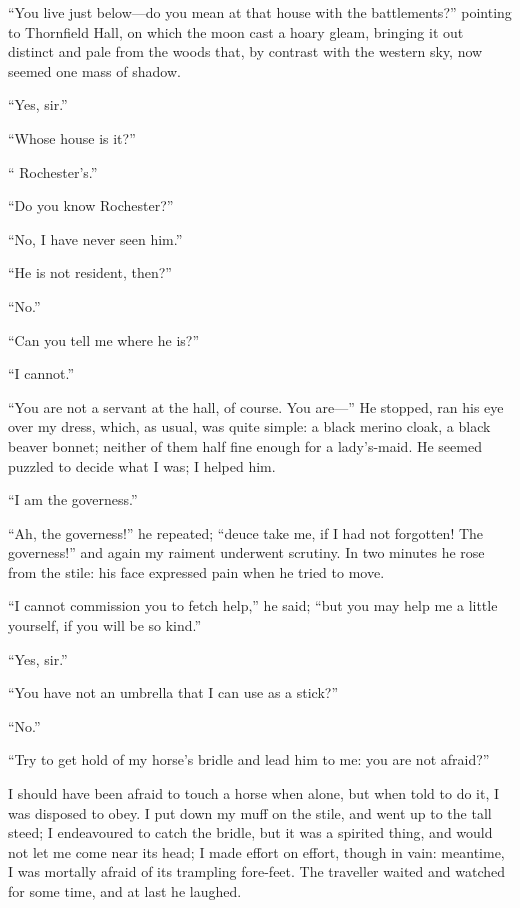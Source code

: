 \enquote{You live just below---do you mean at that house with the
battlements?} pointing to Thornfield Hall, on which the moon cast a
hoary gleam, bringing it out distinct and pale from the woods that, by
contrast with the western sky, now seemed one mass of shadow.

\enquote{Yes, sir.}

\enquote{Whose house is it?}

\enquote{\Mr{} Rochester's.}

\enquote{Do you know \Mr{} Rochester?}

\enquote{No, I have never seen him.}

\enquote{He is not resident, then?}

\enquote{No.}

\enquote{Can you tell me where he is?}

\enquote{I cannot.}

\enquote{You are not a servant at the hall, of course. You are---} He
stopped, ran his eye over my dress, which, as usual, was quite simple: a
black merino cloak, a black beaver bonnet; neither of them half fine
enough for a lady's-maid. He seemed puzzled to decide what I was; I
helped him.

\enquote{I am the governess.}

\enquote{Ah, the governess!} he repeated; \enquote{deuce take me, if I
had not forgotten! The governess!} and again my raiment underwent
scrutiny. In two minutes he rose from the stile: his face expressed
pain when he tried to move.

\enquote{I cannot commission you to fetch help,} he said; \enquote{but
you may help me a little yourself, if you will be so kind.}

\enquote{Yes, sir.}

\enquote{You have not an umbrella that I can use as a stick?}

\enquote{No.}

\enquote{Try to get hold of my horse's bridle and lead him to me: you
are not afraid?}

I should have been afraid to touch a horse when alone, but when told to
do it, I was disposed to obey. I put down my muff on the stile, and
went up to the tall steed; I endeavoured to catch the bridle, but it was
a spirited thing, and would not let me come near its head; I made effort
on effort, though in vain: meantime, I was mortally afraid of its
trampling fore-feet. The traveller waited and watched for some time,
and at last he laughed.

